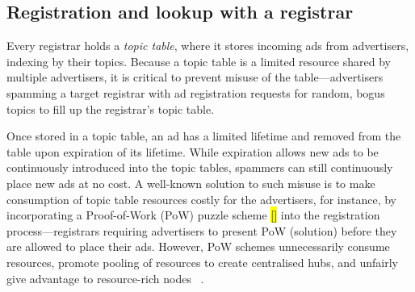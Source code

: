 \subsection{Registration and lookup with a registrar}
Every registrar holds a \emph{topic table}, where it stores incoming ads from advertisers, indexing by their topics. Because a topic table is a limited resource shared by multiple advertisers, it is critical to prevent misuse of the table---\eg advertisers spamming a target registrar with ad registration requests for random, bogus topics to fill up the registrar's topic table. %

Once stored in a topic table, an ad has a limited lifetime and removed from the table upon expiration of its lifetime. While expiration allows new ads to be continuously introduced into the topic tables, spammers can still continuously place new ads at no cost. A well-known solution to such misuse is to make consumption of topic table resources costly for the advertisers, for instance, by incorporating a Proof-of-Work (PoW) puzzle scheme \hl{[]} into the registration process---\eg registrars requiring advertisers to present PoW (\ie solution) before they are allowed to place their ads. However, PoW schemes unnecessarily consume resources, promote pooling of resources to create centralised hubs, and unfairly give advantage to resource-rich nodes ~\cite{gervais2014bitcoin}. 




